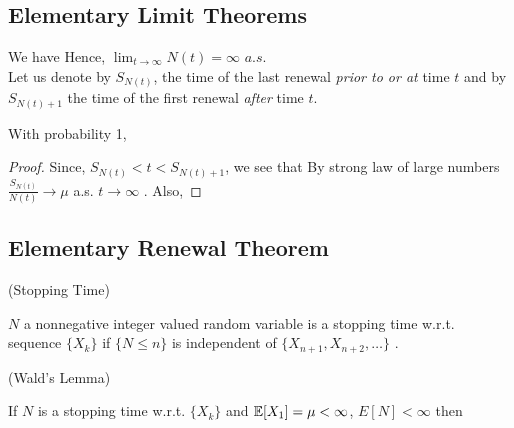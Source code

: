 \documentclass[all-lectures.tex]{subfiles}
\author{}
\begin{document}
\setcounter{chapter}{2}
\setcounter{section}{2}
\section*{}

\subsection{Elementary Limit Theorems}
We have 
Hence, $\lim_{t\to\infty} N(t) = \infty$ $a.s$. \\
\indent Let us denote by $S_{N(t)}$, the time of the last renewal \textit{prior to or at} time $t$ and by $S_{N(t)+1}$ the time of the first renewal \textit{after} time $t$.
\begin{prop}
With probability 1,
\end{prop}
\begin{proof}
Since, $S_{N(t)} < t < S_{N(t)+1}$, we see that
By strong law of large numbers $\frac{S_{N(t)}}{N(t)} \to \mu$ a.s. $t \to \infty$ . Also,
 \qedhere
\end{proof}

\subsection{Elementary Renewal Theorem}
\begin{defn}
(Stopping Time)

$N$ a nonnegative integer valued random variable is a stopping time w.r.t. sequence $\{X_k\}$ if $\{ N\le n\}$ is independent of $\{X_{n+1}, X_{n+2}, \dots\}$ .
\end{defn}

\begin{thm}
(Wald's Lemma)

If $N$ is a stopping time w.r.t. $\{X_k\}$ and $\mathbb{E}[X_1] = \mu < \infty$, $E[N] < \infty$ then
\end{thm}
\end{document}
